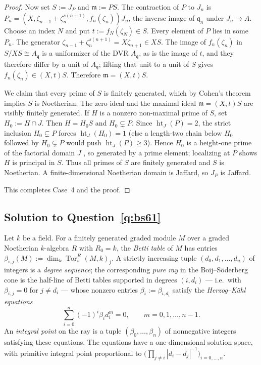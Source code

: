 \documentclass[11pt,reqno]{amsart}
\numberwithin{equation}{section}
\theoremstyle{definition}
\begin{document}
\begin{proof}
Now set $S:=J_P$ and $\mathfrak m:=PS$. The contraction of $P$ to $J_n$
is $P_n=(X,\zeta_{n-1}+\zeta_n^{s(n+1)},f_n(\zeta_n))J_n$, the inverse
image of $\mathfrak q_n$ under $J_n\to A$. Choose an index $N$ and put
$t:=f_N(\zeta_N)\in S$. Every element of $P$ lies in some $P_n$. The
generator $\zeta_{n-1}+\zeta_n^{s(n+1)}=X\zeta_{n+1}\in XS$. The image
of $f_n(\zeta_n)$ in $S/XS\cong A_{\mathfrak q}$ is a uniformizer of the
DVR $A_{\mathfrak q}$, as is the image of $t$, and they therefore differ
by a unit of $A_{\mathfrak q}$; lifting that unit to a unit of $S$ gives
$f_n(\zeta_n)\in(X,t)S$. Therefore $\mathfrak m=(X,t)S$.

We claim that every prime of $S$ is finitely generated, which by
Cohen's theorem implies $S$ is Noetherian. The zero ideal and the
maximal ideal $\mathfrak m=(X,t)S$ are visibly finitely generated. If
$H$ is a nonzero non-maximal prime of $S$, set $H_0:=H\cap J$. Then
$H=H_0 S$ and $H_0\subsetneq P$. Since $\operatorname{ht}_J(P)=2$, the
strict inclusion $H_0\subsetneq P$ forces $\operatorname{ht}_J(H_0)=1$
(else a length-two chain below $H_0$ followed by $H_0\subsetneq P$ would
push $\operatorname{ht}_J(P)\ge 3$). Hence $H_0$ is a height-one prime of
the factorial domain $J$ \cite{David1973}, so generated by a prime
element; localizing at $P$ shows $H$ is principal in $S$. Thus all
primes of $S$ are finitely generated and $S$ is Noetherian. A
finite-dimensional Noetherian domain is Jaffard, so $J_P$ is Jaffard.

This completes Case~4 and the proof.
\end{proof}



\subsection{Solution to Question~\ref{q:bs61}}\label{subsec:proof-bs61}

Let $k$ be a field. For a finitely generated graded module $M$ over a
graded Noetherian $k$-algebra $R$ with $R_0=k$, the \emph{Betti table}
of $M$ has entries
$\beta_{i,j}(M):=\dim_k\operatorname{Tor}_i^R(M,k)_j$. A strictly
increasing tuple $(d_0,d_1,\dots,d_n)$ of integers is a \emph{degree
sequence}; the corresponding \emph{pure ray} in the Boij--S\"oderberg
cone is the half-line of Betti tables supported in degrees $(i,d_i)$
--- i.e.\ with $\beta_{i,j}=0$ for $j\ne d_i$ --- whose nonzero entries
$\beta_i:=\beta_{i,d_i}$ satisfy the \emph{Herzog--K\"uhl equations}
\[
   \sum_{i=0}^n (-1)^i \beta_i d_i^m=0,\qquad m=0,1,\dots,n-1.
\]
An \emph{integral point} on the ray is a tuple
$(\beta_0,\dots,\beta_n)$ of nonnegative integers satisfying these
equations. The equations have a one-dimensional solution space, with
primitive integral point proportional to
$\bigl(\prod_{j\ne i}|d_i-d_j|^{-1}\bigr)_{i=0,\dots,n}$.
\end{document}
